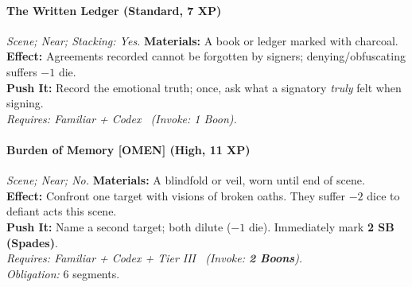 \paragraph{The Written Ledger (Standard, 7 XP)} \emph{Scene; Near; Stacking: Yes.}
\textbf{Materials:} A book or ledger marked with charcoal.\\
\textbf{Effect:} Agreements recorded cannot be forgotten by signers; denying/obfuscating suffers \(-1\) die.\\
\textbf{Push It:} Record the emotional truth; once, ask what a signatory \emph{truly} felt when signing.\\
\emph{Requires: Familiar + Codex \ (\textit{Invoke:} 1 Boon).}

\paragraph{Burden of Memory \textnormal{[OMEN]} (High, 11 XP)} \emph{Scene; Near; No.}
\textbf{Materials:} A blindfold or veil, worn until end of scene.\\
\textbf{Effect:} Confront one target with visions of broken oaths. They suffer \(-2\) dice to defiant acts this scene.\\
\textbf{Push It:} Name a second target; both dilute (\(-1\) die). Immediately mark \textbf{2 SB (Spades)}.\\
\emph{Requires: Familiar + Codex + Tier III \ (\textit{Invoke:} \textbf{2 Boons}).}\\
\emph{Obligation:} 6 segments.
